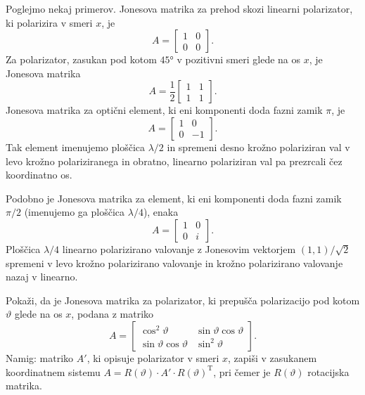 Poglejmo nekaj primerov. Jonesova matrika za prehod skozi linearni polarizator, ki
polarizira v smeri $x$, je
\begin{equation}
A=\left[\begin{array}{cc}
1 & 0\\
0 & 0
\end{array}\right]\!.
\end{equation}
Za polarizator, zasukan pod kotom $45\si{\degree}$ v pozitivni 
smeri glede na os $x$, je Jonesova matrika
\begin{equation}
A=\frac{1}{2}\left[\begin{array}{cc}
1 & 1\\
1 & 1
\end{array}\right]\!.
\end{equation}
Jonesova matrika za optični element, ki eni komponenti doda fazni zamik $\pi$, je
\begin{equation}
A=\left[\begin{array}{cc}
1 & 0\\
0 & -1
\end{array}\right].
\end{equation}
Tak element imenujemo ploščica $\lambda/2$ in 
spremeni desno krožno polariziran val v levo krožno polariziranega in obratno, 
linearno polariziran val pa prezrcali čez koordinatno os. 

Podobno je Jonesova matrika za element, ki eni komponenti doda fazni zamik $\pi/2$ 
(imenujemo ga ploščica $\lambda/4$), enaka
\begin{equation}
A=\left[\begin{array}{cc}
1 & 0\\
0 & i
\end{array}\right]\!.
\end{equation}
Ploščica $\lambda/4$ linearno polarizirano valovanje z Jonesovim vektorjem $(1,1)/\sqrt{2}$
spremeni v levo krožno polarizirano valovanje in krožno polarizirano
valovanje nazaj v linearno. 

\begin{definition}
Pokaži, da je Jonesova matrika za polarizator,
ki prepušča polarizacijo pod kotom $\vartheta$ glede na os $x$, podana z matriko
\begin{equation}
A=\left[\begin{array}{cc}
\cos^{2}\vartheta & \sin\vartheta\cos\vartheta\\
\sin\vartheta\cos\vartheta & \sin^{2}\vartheta
\end{array}\right]\!.
\end{equation}
Namig: matriko $A'$, ki opisuje polarizator v smeri $x$, zapiši v zasukanem
koordinatnem sistemu $A=R(\vartheta) \cdot {A'}\cdot R(\vartheta)^\textrm{T}$, 
pri čemer je $R(\vartheta)$ rotacijska matrika.
\end{definition}

